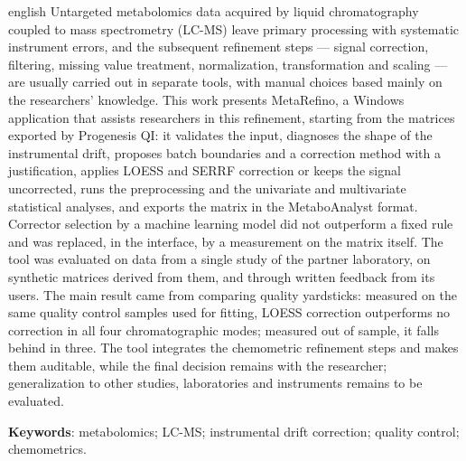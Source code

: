 \begin{resumo}[Abstract]
 \begin{otherlanguage*}{english}
   Untargeted metabolomics data acquired by liquid chromatography coupled to mass spectrometry (LC-MS) leave primary processing with systematic instrument errors, and the subsequent refinement steps --- signal correction, filtering, missing value treatment, normalization, transformation and scaling --- are usually carried out in separate tools, with manual choices based mainly on the researchers' knowledge. This work presents MetaRefino, a Windows application that assists researchers in this refinement, starting from the matrices exported by Progenesis QI: it validates the input, diagnoses the shape of the instrumental drift, proposes batch boundaries and a correction method with a justification, applies LOESS and SERRF correction or keeps the signal uncorrected, runs the preprocessing and the univariate and multivariate statistical analyses, and exports the matrix in the MetaboAnalyst format. Corrector selection by a machine learning model did not outperform a fixed rule and was replaced, in the interface, by a measurement on the matrix itself. The tool was evaluated on data from a single study of the partner laboratory, on synthetic matrices derived from them, and through written feedback from its users. The main result came from comparing quality yardsticks: measured on the same quality control samples used for fitting, LOESS correction outperforms no correction in all four chromatographic modes; measured out of sample, it falls behind in three. The tool integrates the chemometric refinement steps and makes them auditable, while the final decision remains with the researcher; generalization to other studies, laboratories and instruments remains to be evaluated.

   \vspace{\onelineskip}

   \noindent
   \textbf{Keywords}: metabolomics; LC-MS; instrumental drift correction; quality control; chemometrics.
 \end{otherlanguage*}
\end{resumo}